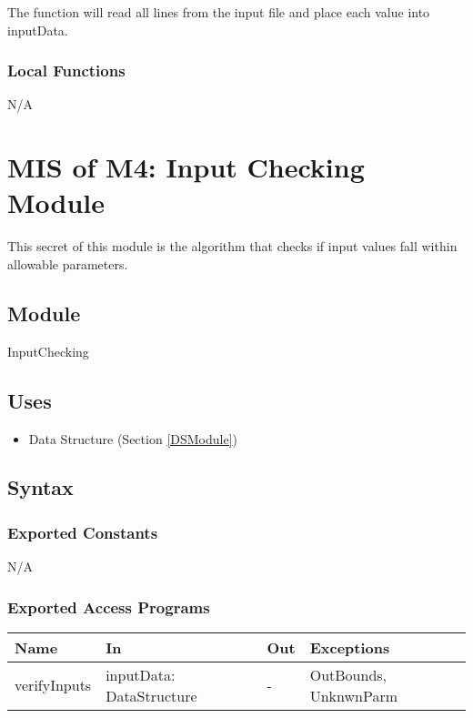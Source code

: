 \documentclass[12pt, titlepage]{article}
\begin{document}
The function will read all lines from the input file and place each value into inputData.

\subsubsection{Local Functions}
N/A

\newpage

\section{MIS of M4: Input Checking Module} \label{ICModule} 

This secret of this module is the algorithm that checks if input values fall within allowable parameters.

\subsection{Module}

InputChecking

\subsection{Uses}

\begin{itemize}
	\item Data Structure (Section \ref{DSModule})
\end{itemize}

\subsection{Syntax}

\subsubsection{Exported Constants}
N/A

\subsubsection{Exported Access Programs}

\begin{center}
	\begin{tabular}{p{2cm} p{3cm} p{3cm} p{2.5cm}}
		\hline
		\textbf{Name} & \textbf{In} & \textbf{Out} & \textbf{Exceptions} \\
		\hline
		verifyInputs & inputData: DataStructure & - & OutBounds, UnknwnParm \\
		\hline
	\end{tabular}
\end{center}
\end{document}
